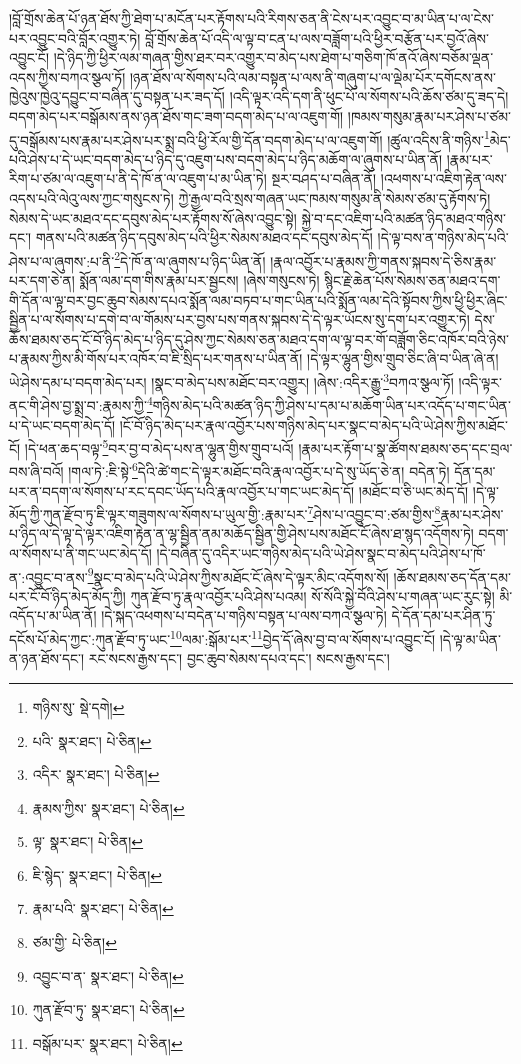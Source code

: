 །བློ་གྲོས་ཆེན་པོ་ཉན་ཐོས་ཀྱི་ཐེག་པ་མངོན་པར་རྟོགས་པའི་རིགས་ཅན་ནི་ངེས་པར་འབྱུང་བ་མ་ཡིན་པ་ལ་ངེས་པར་འབྱུང་བའི་བློར་འགྱུར་ཏེ། བློ་གྲོས་ཆེན་པོ་འདི་ལ་ལྟ་བ་ངན་པ་ལས་བཟློག་པའི་ཕྱིར་བརྩོན་པར་བྱའོ་ཞེས་འབྱུང་ངོ། །དེ་ཉིད་ཀྱི་ཕྱིར་ལམ་གཞན་གྱིས་ཐར་བར་འགྱུར་བ་མེད་པས་ཐེག་པ་གཅིག་ཁོ་ནའོ་ཞེས་བཅོམ་ལྡན་འདས་ཀྱིས་བཀའ་སྩལ་ཏོ། །ཉན་ཐོས་ལ་སོགས་པའི་ལམ་བསྟན་པ་ལས་ནི་གཞུག་པ་ལ་ལྡེམ་པོར་དགོངས་ནས་ཁྱེའུས་ཁྱེའུ་དབྱུང་བ་བཞིན་དུ་བསྟན་པར་ཟད་དོ། །འདི་ལྟར་འདི་དག་ནི་ཕུང་པོ་ལ་སོགས་པའི་ཆོས་ཙམ་དུ་ཟད་དེ། བདག་མེད་པར་བསྒོམས་ནས་ཉན་ཐོས་གང་ཟག་བདག་མེད་པ་ལ་འཇུག་གོ། །ཁམས་གསུམ་རྣམ་པར་ཤེས་པ་ཙམ་དུ་བསྒོམས་པས་རྣམ་པར་ཤེས་པར་སྨྲ་བའི་ཕྱི་རོལ་གྱི་དོན་བདག་མེད་པ་ལ་འཇུག་གོ། །ཚུལ་འདིས་ནི་གཉིས་\footnote{གཉིས་སུ་  སྡེ་དགེ། }མེད་པའི་ཤེས་པ་དེ་ཡང་བདག་མེད་པ་ཉིད་དུ་འཇུག་པས་བདག་མེད་པ་ཉིད་མཆོག་ལ་ཞུགས་པ་ཡིན་ནོ། །རྣམ་པར་རིག་པ་ཙམ་ལ་འཇུག་པ་ནི་དེ་ཁོ་ན་ལ་འཇུག་པ་མ་ཡིན་ཏེ། སྔར་བཤད་པ་བཞིན་ནོ། །འཕགས་པ་འཇིག་རྟེན་ལས་འདས་པའི་ལེའུ་ལས་ཀྱང་གསུངས་ཏེ། ཀྱེ་རྒྱལ་བའི་སྲས་གཞན་ཡང་ཁམས་གསུམ་ནི་སེམས་ཙམ་དུ་རྟོགས་ཏེ། སེམས་དེ་ཡང་མཐའ་དང་དབུས་མེད་པར་རྟོགས་སོ་ཞེས་འབྱུང་སྟེ། སྐྱེ་བ་དང་འཇིག་པའི་མཚན་ཉིད་མཐའ་གཉིས་དང་། གནས་པའི་མཚན་ཉིད་དབུས་མེད་པའི་ཕྱིར་སེམས་མཐའ་དང་དབུས་མེད་དོ། །དེ་ལྟ་བས་ན་གཉིས་མེད་པའི་ཤེས་པ་ལ་ཞུགས་:པ་ནི་\footnote{པའི་  སྣར་ཐང་།  པེ་ཅིན། }དེ་ཁོ་ན་ལ་ཞུགས་པ་ཉིད་ཡིན་ནོ། །རྣལ་འབྱོར་པ་རྣམས་ཀྱི་གནས་སྐབས་དེ་ཅིས་རྣམ་པར་དག་ཅེ་ན། སྨོན་ལམ་དག་གིས་རྣམ་པར་སྦྱངས། །ཞེས་གསུངས་ཏེ། སྙིང་རྗེ་ཆེན་པོས་སེམས་ཅན་མཐའ་དག་གི་དོན་ལ་ལྟ་བར་བྱང་ཆུབ་སེམས་དཔའ་སྨོན་ལམ་བཏབ་པ་གང་ཡིན་པའི་སྨོན་ལམ་དེའི་སྟོབས་ཀྱིས་ཕྱི་ཕྱིར་ཞིང་སྦྱིན་པ་ལ་སོགས་པ་དགེ་བ་ལ་གོམས་པར་བྱས་པས་གནས་སྐབས་དེ་དེ་ལྟར་ཡོངས་སུ་དག་པར་འགྱུར་ཏེ། དེས་ཆོས་ཐམས་ཅད་ངོ་བོ་ཉིད་མེད་པ་ཉིད་དུ་ཤེས་ཀྱང་སེམས་ཅན་མཐའ་དག་ལ་ལྟ་བར་གོ་བཟློག་ཅིང་འཁོར་བའི་ཉེས་པ་རྣམས་ཀྱིས་མི་གོས་པར་འཁོར་བ་ཇི་སྲིད་པར་གནས་པ་ཡིན་ནོ། །དེ་ལྟར་ལྷུན་གྱིས་གྲུབ་ཅིང་ཞི་བ་ཡིན་ཞེ་ན། ཡེ་ཤེས་དམ་པ་བདག་མེད་པར། །སྣང་བ་མེད་པས་མཐོང་བར་འགྱུར། །ཞེས་:འདིར་རྒྱུ་\footnote{འདིར་  སྣར་ཐང་།  པེ་ཅིན། }བཀའ་སྩལ་ཏོ། །འདི་ལྟར་ནང་གི་ཤེས་བྱ་སྨྲ་བ་:རྣམས་ཀྱི་\footnote{རྣམས་ཀྱིས་  སྣར་ཐང་།  པེ་ཅིན། }གཉིས་མེད་པའི་མཚན་ཉིད་ཀྱི་ཤེས་པ་དམ་པ་མཆོག་ཡིན་པར་འདོད་པ་གང་ཡིན་པ་དེ་ཡང་བདག་མེད་དོ། །ངོ་བོ་ཉིད་མེད་པར་རྣལ་འབྱོར་པས་གཉིས་མེད་པར་སྣང་བ་མེད་པའི་ཡེ་ཤེས་ཀྱིས་མཐོང་ངོ། །དེ་ཕན་ཆད་བལྟ་\footnote{ལྟ་  སྣར་ཐང་།  པེ་ཅིན། }བར་བྱ་བ་མེད་པས་ན་ལྷུན་གྱིས་གྲུབ་པའོ། །རྣམ་པར་རྟོག་པ་སྣ་ཚོགས་ཐམས་ཅད་དང་བྲལ་བས་ཞི་བའོ། །གལ་ཏེ་:ཇི་སྟེ་\footnote{ཇི་སྙེད་  སྣར་ཐང་།  པེ་ཅིན། }དེའི་ཚེ་གང་དེ་ལྟར་མཐོང་བའི་རྣལ་འབྱོར་པ་དེ་སུ་ཡོད་ཅེ་ན། བདེན་ཏེ། དོན་དམ་པར་ན་བདག་ལ་སོགས་པ་རང་དབང་ཡོད་པའི་རྣལ་འབྱོར་པ་གང་ཡང་མེད་དོ། །མཐོང་བ་ཅི་ཡང་མེད་དོ། །དེ་ལྟ་མོད་ཀྱི་ཀུན་རྫོབ་ཏུ་ཇི་ལྟར་གཟུགས་ལ་སོགས་པ་ཡུལ་གྱི་:རྣམ་པར་\footnote{རྣམ་པའི་  སྣར་ཐང་།  པེ་ཅིན། }ཤེས་པ་འབྱུང་བ་:ཙམ་གྱིས་\footnote{ཙམ་གྱི་  པེ་ཅིན། }རྣམ་པར་ཤེས་པ་ཉིད་ལ་དེ་ལྟ་དེ་ལྟར་འཇིག་རྟེན་ན་ལྷ་སྦྱིན་ནམ་མཆོད་སྦྱིན་གྱི་ཤེས་པས་མཐོང་ངོ་ཞེས་ཐ་སྙད་འདོགས་ཏེ། བདག་ལ་སོགས་པ་ནི་གང་ཡང་མེད་དོ། །དེ་བཞིན་དུ་འདིར་ཡང་གཉིས་མེད་པའི་ཡེ་ཤེས་སྣང་བ་མེད་པའི་ཤེས་པ་ཁོ་ན་:འབྱུང་བ་ནས་\footnote{འབྱུང་བ་ན་  སྣར་ཐང་།  པེ་ཅིན། }སྣང་བ་མེད་པའི་ཡེ་ཤེས་ཀྱིས་མཐོང་ངོ་ཞེས་དེ་ལྟར་མིང་འདོགས་སོ། །ཆོས་ཐམས་ཅད་དོན་དམ་པར་ངོ་བོ་ཉིད་མེད་མོད་ཀྱི། ཀུན་རྫོབ་ཏུ་རྣལ་འབྱོར་པའི་ཤེས་པའམ། སོ་སོའི་སྐྱེ་བོའི་ཤེས་པ་གཞན་ཡང་རུང་སྟེ། མི་འདོད་པ་མ་ཡིན་ནོ། །དེ་སྐད་འཕགས་པ་བདེན་པ་གཉིས་བསྟན་པ་ལས་བཀའ་སྩལ་ཏེ། དེ་དོན་དམ་པར་ཤིན་ཏུ་དངོས་པོ་མེད་ཀྱང་:ཀུན་རྫོབ་ཏུ་ཡང་\footnote{ཀུན་རྫོབ་ཏུ་  སྣར་ཐང་།  པེ་ཅིན། }ལམ་:སྒོམ་པར་\footnote{བསྒོམ་པར་  སྣར་ཐང་།  པེ་ཅིན། }བྱེད་དོ་ཞེས་བྱ་བ་ལ་སོགས་པ་འབྱུང་ངོ། །དེ་ལྟ་མ་ཡིན་ན་ཉན་ཐོས་དང་། རང་སངས་རྒྱས་དང་། བྱང་ཆུབ་སེམས་དཔའ་དང་། སངས་རྒྱས་དང་། 
